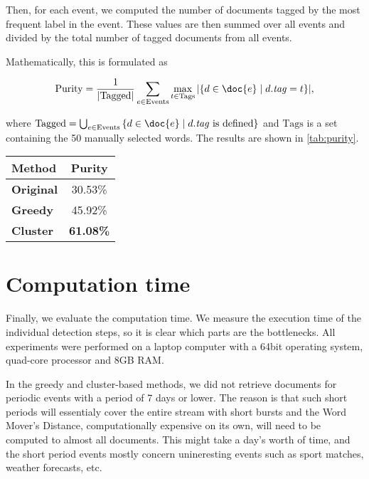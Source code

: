 Then, for each event, we computed the number of documents tagged by the most frequent label in the event. These values are then summed over all events and divided by the total number of tagged documents from all events.

Mathematically, this is formulated as

\begin{equation}
	\text{Purity} = \frac{1}{\left| \text{Tagged} \right|} \sum_{e \in \text{Events}}{\max_{t \in \text{Tags}} {\left| \{ d \in \doc{e} \mid d.\mathit{tag} = t \} \right|} },
\end{equation}

where $\text{Tagged} = \bigcup_{e \in \text{Events}}{\{ d \in \doc{e} \mid d.\mathit{tag} \text{ is defined} \}}$ and $\text{Tags}$ is a set containing the 50 manually selected words. The results are shown in \autoref{tab:purity}.

\hspace{\fill}

\begin{minipage}{\linewidth}
\centering
\begin{tabular}{ l c }\toprule[1.5pt]
\bf Method 	 & \bf Purity \\ \midrule
\bf Original &  30.53\% \\
\bf Greedy   &  45.92\% \\
\bf Cluster &  \bf 61.08\% \\ \bottomrule[1.25pt]
\end {tabular}\par
{} \label{tab:purity} 
\end{minipage}

\hspace{\fill}

\section{Computation time}

Finally, we evaluate the computation time. We measure the execution time of the individual detection steps, so it is clear which parts are the bottlenecks. All experiments were performed on a laptop computer with a 64bit operating system, quad-core processor and 8GB RAM.

In the greedy and cluster-based methods, we did not retrieve documents for periodic events with a period of 7 days or lower. The reason is that such short periods will essentialy cover the entire stream with short bursts and the Word Mover's Distance, computationally expensive on its own, will need to be computed to almost all documents. This might take a day's worth of time, and the short period events mostly concern unineresting events such as sport matches, weather forecasts, etc.

